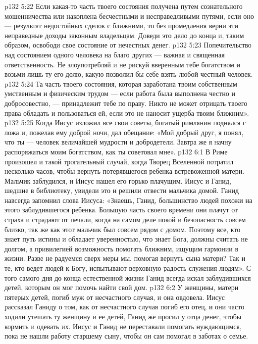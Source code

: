 \vs p132 5:22 \pc {}\bibnobreakspace Если какая\hyp{}то часть твоего состояния получена путем сознательного мошенничества или накоплена бесчестными и несправедливыми путями, если оно --- результат недостойных сделок с ближними, то без промедления верни эти неправедные доходы законным владельцам. Доведи это дело до конца и, таким образом, освободи свое состояние от нечестных денег.
\vs p132 5:23 \pc {}\bibnobreakspace Попечительство над состоянием одного человека на благо других --- важная и священная ответственность. Не злоупотребляй и не рискуй вверенным тебе богатством и возьми лишь ту его долю, какую позволил бы себе взять любой честный человек.
\vs p132 5:24 \pc {}\bibnobreakspace Та часть твоего состояния, которая заработана твоим собственным умственным и физическим трудом --- если работа была выполнена честно и добросовестно, --- принадлежит тебе по праву. Никто не может отрицать твоего права обладать и пользоваться ей, если это не наносит ущерба твоим ближним».
\vs p132 5:25 \pc Когда Иисус изложил все свои советы, богатый римлянин поднялся с ложа и, пожелав ему доброй ночи, дал обещание: «Мой добрый друг, я понял, что ты --- человек величайшей мудрости и добродетели. Завтра же я начну распоряжаться моим богатством, как ты советовал мне».
\vs p132 6:1 В Риме произошел и такой трогательный случай, когда Творец Вселенной потратил несколько часов, чтобы вернуть потерявшегося ребенка встревоженной матери. Мальчик заблудился, и Иисус нашел его горько плачущим. Иисус и Ганид, шедшие в библиотеку, увидели это и решили отвести мальчика домой. Ганид навсегда запомнил слова Иисуса: «Знаешь, Ганид, большинство людей похожи на этого заблудившегося ребенка. Большую часть своего времени они плачут от страха и страдают от печали, когда на самом деле покой и безопасность совсем близко, так же как этот мальчик был совсем рядом с домом. Поэтому все, кто знает путь истины и обладает уверенностью, что знает Бога, должны считать не долгом, а привилегией возможность помогать ближним, ищущим гармонии в жизни. Разве не радуемся сверх меры мы, помогая вернуть сына матери? Так и те, кто ведет людей к Богу, испытывают верховную радость служения людям». С того самого дня до конца естественной жизни Ганид всегда искал заблудившихся детей, которым он мог помочь найти свой дом.
\vs p132 6:2 \pc У женщины, матери пятерых детей, погиб муж от несчастного случая, и она овдовела. Иисус рассказал Ганиду о том, как от несчастного случая погиб его отец, и они часто ходили утешать ту женщину и ее детей, Ганид же просил у отца денег, чтобы кормить и одевать их. Иисус и Ганид не переставали помогать нуждающимся, пока не нашли работу старшему сыну, чтобы он сам помогал в заботах о семье.
